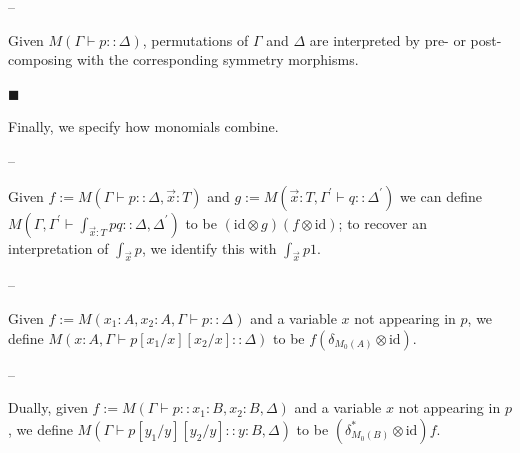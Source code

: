  
 
\par\noindent  – 
 
Given $M(\Gamma\vdash p::\Delta)$, permutations of $\Gamma$ and $\Delta$ are interpreted by pre- or post-composing with the corresponding symmetry morphisms.\par
 
 
  
 
 
\par\noindent  $\blacksquare$ 
 
Finally, we specify how monomials combine.\par
  
\par\noindent  – 
 
Given $f:=M(\Gamma\vdash p::\Delta,\vec{x}:T)$ and $g:=M(\vec{x}:T,\Gamma^{\prime}\vdash q::\Delta^{\prime})$ we can define $M\left(\Gamma,\Gamma^{\prime}\vdash\int_{\vec{x}:T}pq::\Delta,\Delta^{\prime}\right)$ to be $(\mathrm{id}\otimes g)(f\otimes\mathrm{id})$; to recover an interpretation of $\int_{\vec{x}}p$, we identify this with $\int_{\vec{x}}p1$.\par
 
 
 
\par\noindent  – 
 
Given $f:=M(x_{1}:A,x_{2}:A,\Gamma\vdash p::\Delta)$ and a variable $x$ not appearing in $p$, we define $M(x:A,\Gamma\vdash p[x_{1}/x][x_{2}/x]::\Delta)$ to be $f(\delta_{M_{0}(A)}\otimes\mathrm{id})$.\par
 
 
 
\par\noindent  – 
 
Dually, given $f:=M(\Gamma\vdash p::x_{1}:B,x_{2}:B,\Delta)$ and a variable $x$ not appearing in $p$, we define $M(\Gamma\vdash p[y_{1}/y][y_{2}/y]::y:B,\Delta)$ to be $(\delta^{*}_{M_{0}(B)}\otimes\mathrm{id})f$.\par
 
 
  
 
  
 
 
